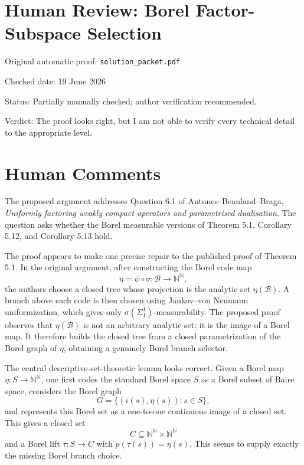 ﻿\documentclass[11pt]{article}
\begin{document}
\section*{Human Review: Borel Factor-Subspace Selection}

\noindent Original automatic proof: \texttt{solution\_packet.pdf}

\noindent Checked date: 19 June 2026

\noindent Status: Partially manually checked; author verification recommended.

\noindent Verdict: The proof looks right, but I am not able to verify every technical detail to the appropriate level.

\section*{Human Comments}

The proposed argument addresses Question 6.1 of Antunes--Beanland--Braga,
\emph{Uniformly factoring weakly compact operators and parametrised
dualisation}.  The question asks whether the Borel measurable versions of
Theorem 5.1, Corollary 5.12, and Corollary 5.13 hold.

The proof appears to make one precise repair to the published proof of
Theorem 5.1.  In the original argument, after constructing the Borel code map
\[
  \eta=\psi\circ\sigma:\mathcal B\longrightarrow \mathbb N^{\mathbb N},
\]
the authors choose a closed tree whose projection is the analytic set
\(\eta(\mathcal B)\).  A branch above each code is then chosen using
Jankov--von Neumann uniformization, which gives only
\(\sigma(\Sigma^1_1)\)-measurability.  The proposed proof observes that
\(\eta(\mathcal B)\) is not an arbitrary analytic set: it is the image of a
Borel map.  It therefore builds the closed tree from a closed parametrization
of the Borel graph of \(\eta\), obtaining a genuinely Borel branch selector.

The central descriptive-set-theoretic lemma looks correct.  Given a Borel map
\(\eta:S\to\mathbb N^{\mathbb N}\), one first codes the standard Borel space
\(S\) as a Borel subset of Baire space, considers the Borel graph
\[
  G=\{(i(s),\eta(s)):s\in S\},
\]
and represents this Borel set as a one-to-one continuous image of a closed
set.  This gives a closed set
\[
  C\subseteq\mathbb N^{\mathbb N}\times\mathbb N^{\mathbb N}
\]
and a Borel lift \(\tau:S\to C\) with \(p(\tau(s))=\eta(s)\).  This seems to
supply exactly the missing Borel branch choice.
\end{document}
